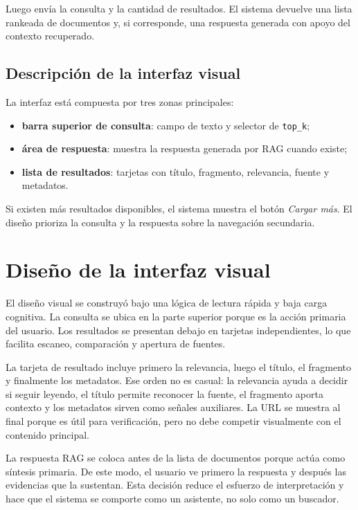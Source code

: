 \documentclass{llncs}
\begin{document}
Luego envía la consulta y la cantidad de resultados. El sistema devuelve una lista rankeada de documentos y, si corresponde, una respuesta generada con apoyo del contexto recuperado.

\subsection{Descripción de la interfaz visual}

La interfaz está compuesta por tres zonas principales:

\begin{itemize}
    \item \textbf{barra superior de consulta}: campo de texto y selector de \texttt{top\_k};
    \item \textbf{área de respuesta}: muestra la respuesta generada por RAG cuando existe;
    \item \textbf{lista de resultados}: tarjetas con título, fragmento, relevancia, fuente y metadatos.
\end{itemize}

Si existen más resultados disponibles, el sistema muestra el botón \textit{Cargar más}. El diseño prioriza la consulta y la respuesta sobre la navegación secundaria.

\section{Diseño de la interfaz visual}

El diseño visual se construyó bajo una lógica de lectura rápida y baja carga cognitiva. La consulta se ubica en la parte superior porque es la acción primaria del usuario. Los resultados se presentan debajo en tarjetas independientes, lo que facilita escaneo, comparación y apertura de fuentes.

La tarjeta de resultado incluye primero la relevancia, luego el título, el fragmento y finalmente los metadatos. Ese orden no es casual: la relevancia ayuda a decidir si seguir leyendo, el título permite reconocer la fuente, el fragmento aporta contexto y los metadatos sirven como señales auxiliares. La URL se muestra al final porque es útil para verificación, pero no debe competir visualmente con el contenido principal.

La respuesta RAG se coloca antes de la lista de documentos porque actúa como síntesis primaria. De este modo, el usuario ve primero la respuesta y después las evidencias que la sustentan. Esta decisión reduce el esfuerzo de interpretación y hace que el sistema se comporte como un asistente, no solo como un buscador.
\end{document}
